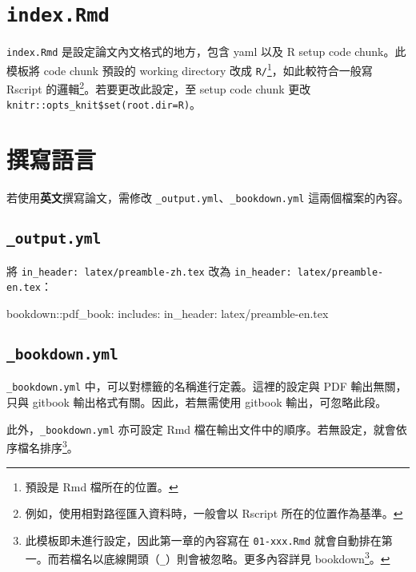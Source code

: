 \documentclass[oneside]{book}
\newenvironment{Shaded}{\begin{snugshade}}{\end{snugshade}}
\newcommand{\AttributeTok}[1]{\textcolor[rgb]{0.77,0.63,0.00}{#1}}
\newcommand{\FunctionTok}[1]{\textcolor[rgb]{0.00,0.00,0.00}{#1}}
\renewcommand{\href}[2]{#2\footnote{\url{#1}}}
\theoremstyle{definition}
\theoremstyle{definition}
\theoremstyle{definition}
\theoremstyle{remark}
\begin{document}
\hypertarget{index-rmd}{%
\section{\texorpdfstring{\texttt{index.Rmd}}{index.Rmd}}\label{index-rmd}}

\texttt{index.Rmd} 是設定論文內文格式的地方，包含 yaml 以及 R setup code chunk。此模板將 code chunk 預設的 working directory 改成 \texttt{R/}\footnote{預設是 Rmd 檔所在的位置。}，如此較符合一般寫 Rscript 的邏輯\footnote{例如，使用相對路徑匯入資料時，一般會以 Rscript 所在的位置作為基準。}。若要更改此設定，至 setup code chunk 更改 \texttt{knitr::opts\_knit\$set(root.dir=\textquotesingle{}R\textquotesingle{})}。

\hypertarget{write-lang}{%
\section{撰寫語言}\label{write-lang}}

若使用\textbf{英文}撰寫論文，需修改 \texttt{\_output.yml}、\texttt{\_bookdown.yml} 這兩個檔案的內容。

\hypertarget{output.yml}{%
\subsection{\texorpdfstring{\texttt{\_output.yml}}{\_output.yml}}\label{output.yml}}

將 \texttt{in\_header:\ latex/preamble-zh.tex} 改為 \texttt{in\_header:\ latex/preamble-en.tex}：

\begin{Shaded}
\begin{Highlighting}[]
\FunctionTok{bookdown:}\AttributeTok{:pdf_book:}
  \FunctionTok{includes:}
    \FunctionTok{in_header:}\AttributeTok{ latex/preamble-en.tex}
\end{Highlighting}
\end{Shaded}

\hypertarget{bookdown.yml}{%
\subsection{\texorpdfstring{\texttt{\_bookdown.yml}}{\_bookdown.yml}}\label{bookdown.yml}}

\texttt{\_bookdown.yml} 中，可以對標籤的名稱進行定義。這裡的設定與 PDF 輸出無關，只與 gitbook 輸出格式有關。因此，若無需使用 gitbook 輸出，可忽略此段。

此外，\texttt{\_bookdown.yml} 亦可設定 Rmd 檔在輸出文件中的順序。若無設定，就會依序檔名排序\footnote{此模板即未進行設定，因此第一章的內容寫在 \texttt{01-xxx.Rmd} 就會自動排在第一。而若檔名以底線開頭（\texttt{\_}）則會被忽略。更多內容詳見 \href{https://bookdown.org/yihui/bookdown/usage.html}{bookdown}。}。
\end{document}

